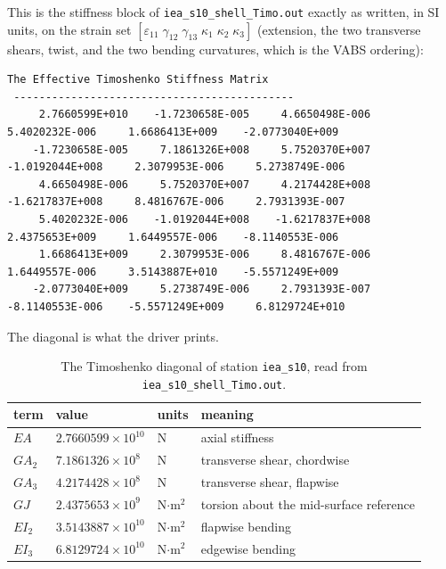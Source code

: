 This is the stiffness block of \texttt{iea\_s10\_shell\_Timo.out} exactly as
written, in SI units, on the strain set
$[\varepsilon_{11}\;\gamma_{12}\;\gamma_{13}\;\kappa_1\;\kappa_2\;\kappa_3]$
(extension, the two transverse shears, twist, and the two bending curvatures,
which is the VABS ordering):

\begin{Verbatim}[fontsize=\tiny,frame=single,framesep=4pt]
 The Effective Timoshenko Stiffness Matrix
 --------------------------------------------
     2.7660599E+010    -1.7230658E-005     4.6650498E-006     5.4020232E-006     1.6686413E+009    -2.0773040E+009
    -1.7230658E-005     7.1861326E+008     5.7520370E+007    -1.0192044E+008     2.3079953E-006     5.2738749E-006
     4.6650498E-006     5.7520370E+007     4.2174428E+008    -1.6217837E+008     8.4816767E-006     2.7931393E-007
     5.4020232E-006    -1.0192044E+008    -1.6217837E+008     2.4375653E+009     1.6449557E-006    -8.1140553E-006
     1.6686413E+009     2.3079953E-006     8.4816767E-006     1.6449557E-006     3.5143887E+010    -5.5571249E+009
    -2.0773040E+009     5.2738749E-006     2.7931393E-007    -8.1140553E-006    -5.5571249E+009     6.8129724E+010
\end{Verbatim}

The diagonal is what the driver prints.

\begin{table}[htbp]
\centering
\small
\begin{tabular}{llll}
\toprule
term & value & units & meaning \\
\midrule
$EA$    & $2.7660599\times10^{10}$ & N               & axial stiffness \\
$GA_2$  & $7.1861326\times10^{8}$  & N               & transverse shear, chordwise \\
$GA_3$  & $4.2174428\times10^{8}$  & N               & transverse shear, flapwise \\
$GJ$    & $2.4375653\times10^{9}$  & N$\cdot$m$^2$   & torsion about the mid-surface reference \\
$EI_2$  & $3.5143887\times10^{10}$ & N$\cdot$m$^2$   & flapwise bending \\
$EI_3$  & $6.8129724\times10^{10}$ & N$\cdot$m$^2$   & edgewise bending \\
\bottomrule
\end{tabular}
\caption{The Timoshenko diagonal of station \texttt{iea\_s10}, read from
\texttt{iea\_s10\_shell\_Timo.out}.}
\label{tab:shell-timo-diag}
\end{table}


